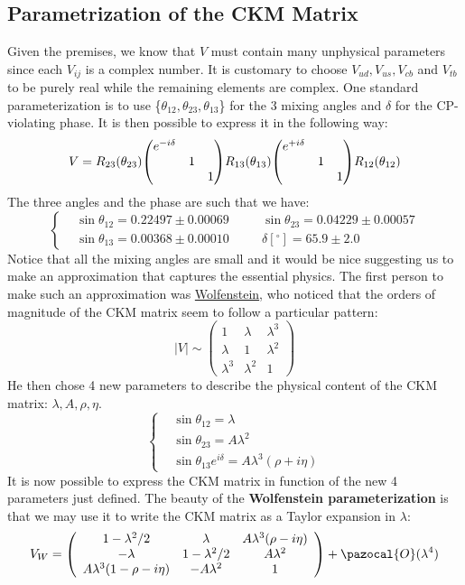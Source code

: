 \documentclass[../main.tex]{subfiles}
\begin{document}
\subsection{Parametrization of the CKM Matrix}
Given the premises, we know that $V$ must contain many unphysical parameters since each $V_{ij}$ is a complex number. It is customary to choose $V_{ud}, V_{us}, V_{cb}$ and $V_{tb}$ to be purely real while the remaining elements are complex. One standard parameterization is to use \{$\theta_{12},\theta_{23},\theta_{13}$\} for the 3 mixing angles and $\delta$ for the CP-violating phase. It is then possible to express it in the following way:
\[
V=R_{23}(\theta_{23})\mqty(\dmat{e^{-i\delta},1,1})R_{13}(\theta_{13})\mqty(\dmat{e^{+i\delta},1,1})R_{12}(\theta_{12})
\]
The three angles and the phase are such that we have:
\[
\left\{
\begin{aligned}
&\sin\theta_{12}=0.22497\pm0.00069\quad && \sin\theta_{23}=0.04229\pm0.00057\\
&\sin\theta_{13}=0.00368\pm0.00010 \quad && \delta[^\circ]=65.9\pm2.0
\end{aligned}
\right.
\]
Notice that all the mixing angles are small and it would be nice suggesting us to make an approximation that captures the essential physics. The first person to make such an approximation was \href{https://en.wikipedia.org/wiki/Lincoln_Wolfenstein}{Wolfenstein}, who noticed that the orders of magnitude of the CKM matrix seem to follow a particular pattern:
\[
|V|\sim
\left(\begin{array}{ccc}
    1 & \lambda & \lambda^3 \\
    \lambda & 1 & \lambda^2 \\
    \lambda^3 & \lambda^2 & 1
\end{array}\right)
\]
He then chose 4 new parameters to describe the physical content of the CKM matrix: $\lambda, A, \rho, \eta$.
\[
\left\{
\begin{aligned}
&\sin\theta_{12}=\lambda\\
&\sin\theta_{23}=A\lambda^2\\
&\sin\theta_{13}e^{i\delta}=A\lambda^3(\rho+i\eta)
\end{aligned}
\right.
\]
It is now possible to express the CKM matrix in function of the new 4 parameters just defined. The beauty of the \textbf{Wolfenstein parameterization} is
that we may use it to write the CKM matrix as a Taylor expansion in $\lambda$:
\[
V_W=\left(\begin{array}{ccc}
    1-\lambda^2/2 & \lambda & A\lambda^3(\rho-i\eta) \\
    -\lambda & 1-\lambda^2/2 & A\lambda^2 \\
    A\lambda^3(1-\rho-i\eta) & -A\lambda^2 & 1
\end{array}\right)
+\pazocal{O}(\lambda^4)
\]
\end{document}
